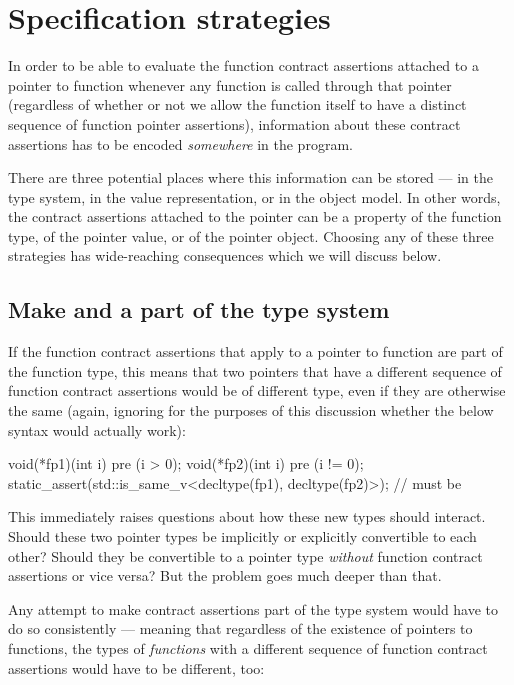 \section{Specification strategies}
\label{sec:specstrat}

In order to be able to evaluate the function contract assertions attached to a pointer to function whenever any function is called through that pointer (regardless of whether or not we allow the function itself to have a distinct sequence of function pointer assertions), information about these contract assertions has to be encoded \emph{somewhere} in the program.

There are three potential places where this information can be stored --- in the type system, in the value representation, or in the object model. In other words, the contract assertions attached to the pointer can be a property of the function type, of the pointer value, or of the pointer object. Choosing any of these three strategies has wide-reaching consequences which we will discuss below.

\subsection{Make  and  a part of the type system}
\label{subsec:maketype}

If the function contract assertions that apply to a pointer to function are part of the function type, this means that two pointers that have a different sequence of function contract assertions would be of different type, even if they are otherwise the same (again, ignoring for the purposes of this discussion whether the below syntax would actually work):
\begin{codeblock}
void(*fp1)(int i) pre (i > 0);
void(*fp2)(int i) pre (i != 0);
static_assert(std::is_same_v<decltype(fp1), decltype(fp2)>);  // must be 
\end{codeblock}
This immediately raises questions about how these new types should interact. Should these two pointer types be implicitly or explicitly convertible to each other? Should they be convertible to a pointer type \emph{without} function contract assertions or vice versa? But the problem goes much deeper than that.

Any attempt to make contract assertions part of the type system would have to do so consistently --- meaning that regardless of the existence of pointers to functions, the types of \emph{functions} with a different sequence of function contract assertions would have to be different, too:

